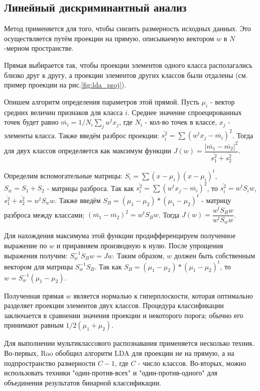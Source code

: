
\subsection{Линейный дискриминантный анализ}

Метод  применяется для того, чтобы снизить размерность исходных данных. Это осуществляется путём проекции на прямую, описываемую вектором $w$ в $N$-мерном пространстве. 

Прямая выбирается так, чтобы проекции элементов одного класса располагались близко друг к другу, а проекции элементов других классов были отдалены (см. пример проекции на рис.\ref{fig:lda_proj}\cite{duda_lda}). 


Опишем алгоритм определения параметров этой прямой\cite{duda_lda}. Пусть $\mu_i$ - вектор средних величин признаков для класса $i$. Среднее значение спроецированных точек будет равно $\overline{m_i}=1/N_i\sum_j w^tx_j$, где $N_i$ - кол-во точек в классе, $x_j$ - элементы класса. Также введём разброс проекции: $\overline{s_i^2}=\sum (w^tx_j-\overline{m_i})^2$. Тогда  для двух классов определяется как максимум функции $J(w)=\dfrac{|\overline{m_1}-\overline{m_2}|^2}{\overline{s_1^2}+\overline{s_2^2}}$.

Определим вспомогательные матрицы: $S_i=\sum(x-\mu_i)(x-\mu_i)^t$, $S_w=S_1+S_2$ - матрицы разброса. Так как $\overline{s_i^2}=\sum (w^tx_j-\overline{m_i})^2$, то $\overline{s_i^2}=w^tS_iw$, $\overline{s_1^2}+\overline{s_2^2}=w^tS_ww$. Также введём $S_B=(\mu_1-\mu_2)*(\mu_1-\mu_2)^t$ - матрицу разброса между классами; $(\overline{m_1}-\overline{m_2})^2=w^tS_Bw$. Тогда $J(w)=\dfrac{w^tS_Bw}{w^tS_ww}$. 

Для нахождения максимума этой функции продифференцируем полученное выражение по $w$ и приравняем производную к нулю. После упрощения выражения получим: $S_w^{-1}S_Bw=Jw$. Таким образом, $w$ должен быть собственным вектором для матрицы $S_w^{-1}S_B$. Так как $S_B=(\mu_1-\mu_2)*(\mu_1-\mu_2)^t$, то $w=S_w^{-1}(\mu_1-\mu_2)$. 

Полученная прямая $w$ является нормалью к гиперплоскости, которая оптимально разделяет проекции элементов двух классов. Процедура классификации заключается в сравнении значения проекции и некоторого порога; обычно его принимают равным $1/2(\mu_1+\mu_2)$.

Для выполнении мультиклассового распознавания применяется несколько техник. Во-первых, Rao\cite{lda_multiclass} обобщил алгоритм LDA для проекции не на прямую, а на подпространство размерности $C-1$, где $C$ - число классов. Во-вторых, можно использовать техники "один-против-всех" и "один-против-одного" для объединения результатов бинарной классификации.




